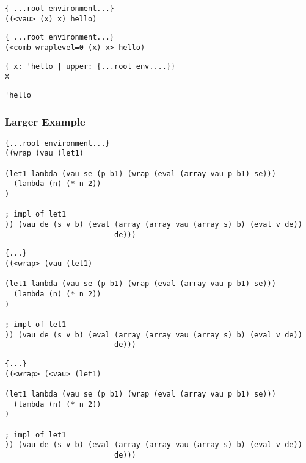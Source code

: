 \documentclass{beamer}
\begin{document}
\begin{frame}[fragile]
\footnotesize
\begin{verbatim}
{ ...root environment...}
((<vau> (x) x) hello)
\end{verbatim}
\end{frame}

\begin{frame}[fragile]
\footnotesize
\begin{verbatim}
{ ...root environment...}
(<comb wraplevel=0 (x) x> hello)
\end{verbatim}
\end{frame}

\begin{frame}[fragile]
\footnotesize
\begin{verbatim}
{ x: 'hello | upper: {...root env....}}
x
\end{verbatim}
\end{frame}

\begin{frame}[fragile]
\footnotesize
\begin{verbatim}
'hello
\end{verbatim}
\end{frame}

\begin{frame}[fragile]
\frametitle{Larger Example}
\footnotesize
\begin{verbatim}
{...root environment...}
((wrap (vau (let1)

(let1 lambda (vau se (p b1) (wrap (eval (array vau p b1) se)))
  (lambda (n) (* n 2))
)

; impl of let1
)) (vau de (s v b) (eval (array (array vau (array s) b) (eval v de))
                         de)))
\end{verbatim}
\end{frame}

\begin{frame}[fragile]
\footnotesize
\begin{verbatim}
{...}
((<wrap> (vau (let1)

(let1 lambda (vau se (p b1) (wrap (eval (array vau p b1) se)))
  (lambda (n) (* n 2))
)

; impl of let1
)) (vau de (s v b) (eval (array (array vau (array s) b) (eval v de))
                         de)))
\end{verbatim}
\end{frame}

\begin{frame}[fragile]
\footnotesize
\begin{verbatim}
{...}
((<wrap> (<vau> (let1)

(let1 lambda (vau se (p b1) (wrap (eval (array vau p b1) se)))
  (lambda (n) (* n 2))
)

; impl of let1
)) (vau de (s v b) (eval (array (array vau (array s) b) (eval v de))
                         de)))
\end{verbatim}
\end{frame}
\end{document}
